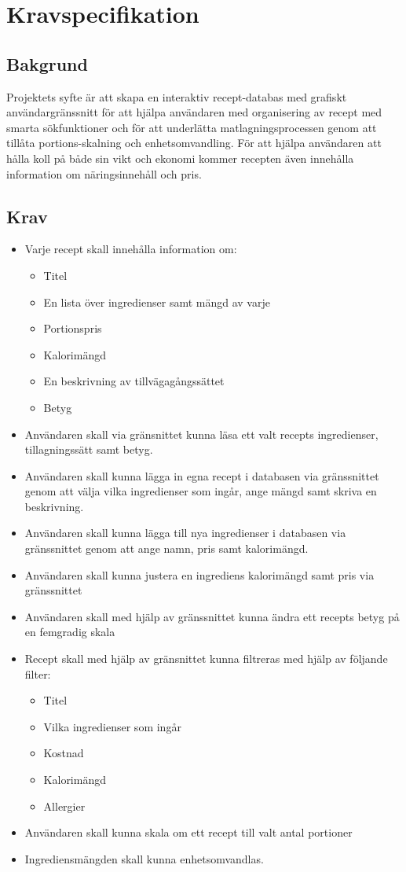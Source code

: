 \documentclass[10pt,a4paper]{report}
\begin{document}
\section{Kravspecifikation}

\subsection{Bakgrund}

Projektets syfte är att skapa en interaktiv recept-databas med grafiskt användargränssnitt för att hjälpa användaren med organisering av recept med smarta sökfunktioner och för att underlätta matlagningsprocessen genom att tillåta portions-skalning och enhetsomvandling. För att hjälpa användaren att hålla koll på både sin vikt och ekonomi kommer recepten även innehålla information om näringsinnehåll och pris.
\subsection{Krav}
\begin{itemize}
\item Varje recept skall innehålla information om:
  \begin{itemize}
    \item Titel
    \item En lista över ingredienser samt mängd av varje
    \item Portionspris
    \item Kalorimängd
    \item En beskrivning av tillvägagångssättet
    \item Betyg
  \end{itemize}
\item Användaren skall via gränsnittet kunna läsa ett valt recepts ingredienser, tillagningssätt samt betyg.
\item Användaren skall kunna lägga in egna recept i databasen via gränssnittet genom att välja vilka ingredienser som ingår, ange mängd samt skriva en beskrivning.
\item Användaren skall kunna lägga till nya ingredienser i databasen via gränssnittet genom att ange namn, pris samt kalorimängd.
\item Användaren skall kunna justera en ingrediens kalorimängd samt pris via gränssnittet
\item Användaren skall med hjälp av gränssnittet kunna ändra ett recepts betyg på en femgradig skala
\item Recept skall med hjälp av gränsnittet kunna filtreras med hjälp av följande filter:
  \begin{itemize}
    \item Titel
    \item Vilka ingredienser som ingår
    \item Kostnad
    \item Kalorimängd
    \item Allergier
  \end{itemize}
\item Användaren skall kunna skala om ett recept till valt antal portioner
\item Ingrediensmängden skall kunna enhetsomvandlas.
\end{itemize}
\end{document}
